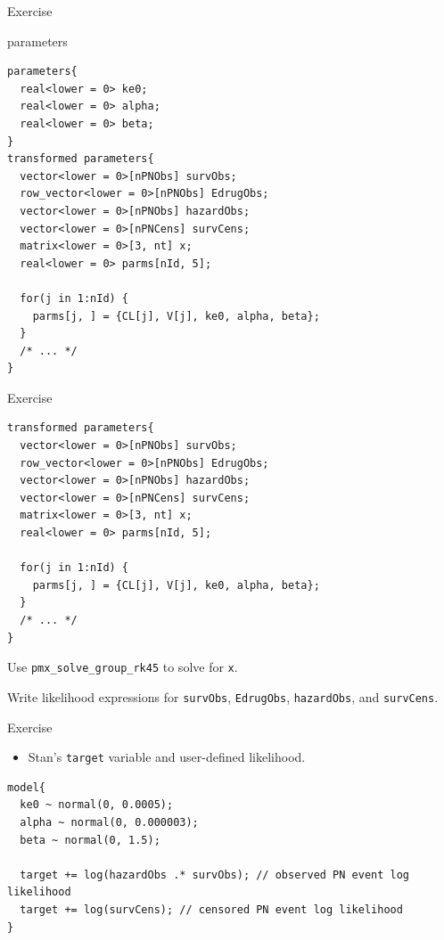 \documentclass[presentation, allowframebreaks]{beamer}
\begin{document}
\begin{frame}[fragile,label={sec:orgfe82de8}]{Exercise}
 \begin{block}{parameters}
\begin{verbatim}
parameters{
  real<lower = 0> ke0;
  real<lower = 0> alpha;
  real<lower = 0> beta;
}
transformed parameters{
  vector<lower = 0>[nPNObs] survObs;
  row_vector<lower = 0>[nPNObs] EdrugObs;
  vector<lower = 0>[nPNObs] hazardObs;
  vector<lower = 0>[nPNCens] survCens;
  matrix<lower = 0>[3, nt] x;
  real<lower = 0> parms[nId, 5];

  for(j in 1:nId) {
    parms[j, ] = {CL[j], V[j], ke0, alpha, beta};
  }
  /* ... */
}
\end{verbatim}
\end{block}
\end{frame}
\begin{frame}[fragile,label={sec:org10e4cfa}]{Exercise}
 \begin{verbatim}
transformed parameters{
  vector<lower = 0>[nPNObs] survObs;
  row_vector<lower = 0>[nPNObs] EdrugObs;
  vector<lower = 0>[nPNObs] hazardObs;
  vector<lower = 0>[nPNCens] survCens;
  matrix<lower = 0>[3, nt] x;
  real<lower = 0> parms[nId, 5];

  for(j in 1:nId) {
    parms[j, ] = {CL[j], V[j], ke0, alpha, beta};
  }
  /* ... */
}
\end{verbatim}
\begin{block}{Use \texttt{pmx\_solve\_group\_rk45} to solve for \texttt{x}.}
\end{block}
\begin{block}{Write likelihood expressions for \texttt{survObs}, \texttt{EdrugObs}, \texttt{hazardObs}, and \texttt{survCens}.}
\end{block}
\end{frame}

\begin{frame}[fragile,label={sec:orgfe7fcbf}]{Exercise}
 \begin{itemize}
\item Stan's \texttt{target} variable and user-defined likelihood.
\end{itemize}
\begin{verbatim}
model{
  ke0 ~ normal(0, 0.0005);
  alpha ~ normal(0, 0.000003);
  beta ~ normal(0, 1.5);

  target += log(hazardObs .* survObs); // observed PN event log likelihood
  target += log(survCens); // censored PN event log likelihood
}
\end{verbatim}
\end{frame}
\end{document}
